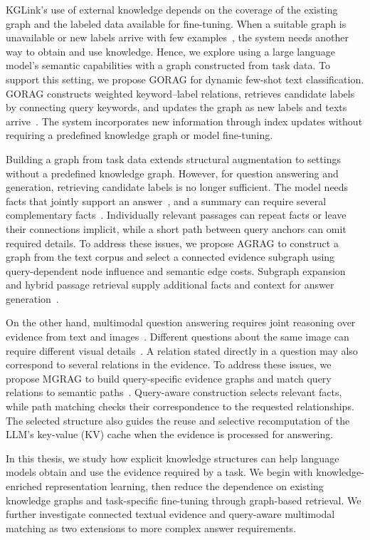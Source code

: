 KGLink's use of external knowledge depends on the coverage of the existing graph and the labeled data available for fine-tuning. When a suitable graph is unavailable or new labels arrive with few examples~\cite{gorag-xia-etal-2021-incremental}, the system needs another way to obtain and use knowledge. Hence, we explore using a large language model's semantic capabilities with a graph constructed from task data. To support this setting, we propose GORAG for dynamic few-shot text classification. GORAG constructs weighted keyword--label relations, retrieves candidate labels by connecting query keywords, and updates the graph as new labels and texts arrive~\cite{gorag-paper}. The system incorporates new information through index updates without requiring a predefined knowledge graph or model fine-tuning.

Building a graph from task data extends structural augmentation to settings without a predefined knowledge graph. However, for question answering and generation, retrieving candidate labels is no longer sufficient. The model needs facts that jointly support an answer~\cite{bg-hipporag}, and a summary can require several complementary facts~\cite{bg-graphrag}. Individually relevant passages can repeat facts or leave their connections implicit, while a short path between query anchors can omit required details. To address these issues, we propose AGRAG to construct a graph from the text corpus and select a connected evidence subgraph using query-dependent node influence and semantic edge costs. Subgraph expansion and hybrid passage retrieval supply additional facts and context for answer generation~\cite{agrag-paper}.

On the other hand, multimodal question answering requires joint reasoning over evidence from text and images~\cite{bg-mmqa}. Different questions about the same image can require different visual details~\cite{bg-stacked-attention}. A relation stated directly in a question may also correspond to several relations in the evidence.
To address these issues, we propose MGRAG to build query-specific evidence graphs and match query relations to semantic paths~\cite{mgrag-paper}. Query-aware construction selects relevant facts, while path matching checks their correspondence to the requested relationships. The selected structure also guides the reuse and selective recomputation of the LLM's key-value (KV) cache when the evidence is processed for answering.

In this thesis, we study how explicit knowledge structures can help language models obtain and use the evidence required by a task. We begin with knowledge-enriched representation learning, then reduce the dependence on existing knowledge graphs and task-specific fine-tuning through graph-based retrieval. We further investigate connected textual evidence and query-aware multimodal matching as two extensions to more complex answer requirements.

